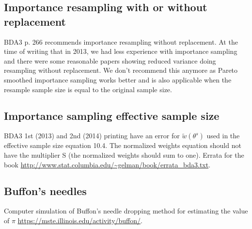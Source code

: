 \documentclass[a4paper,11pt,english]{article}
\begin{document}
 \subsection*{Importance resampling with or without replacement}

 BDA3 p. 266 recommends importance resampling without replacement. At
 the time of writing that in 2013, we had less experience with
 importance sampling and there were some reasonable papers showing
 reduced variance doing resampling without replacement. We don't
 recommend this anymore as Pareto smoothed importance sampling works
 better and is also applicable when the resample sample size is equal
 to the original sample size.
 
 \subsection*{Importance sampling effective sample size}
 
 {\color{red} BDA3 1st (2013) and 2nd (2014) printing have an error
   for $\tilde{w}(\theta^s)$ used in the effective sample size
   equation 10.4. The normalized weights equation should not have the
   multiplier S (the normalized weights should sum to one). Errata for
   the book
   \url{http://www.stat.columbia.edu/~gelman/book/errata_bda3.txt}.}
 
 \subsection*{Buffon's needles}

 Computer simulation of Buffon's needle dropping method for estimating
 the value of $\pi$ \url{https://mste.illinois.edu/activity/buffon/}. 

 
\end{document}
